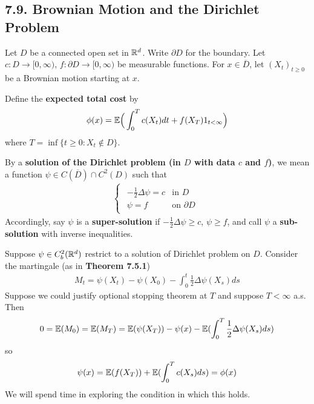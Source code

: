 \documentclass[12pt,a4paper]{report}
\begin{document}
\subsection*{7.9. Brownian Motion and the Dirichlet Problem}

Let $D$ be a connected open set in $\mathbb{R}^d$. Write $\partial D$ for the boundary. Let $c: D \rightarrow [0,\infty)$, $f: \partial D \rightarrow [0,\infty)$ be measurable functions. For $x\in \overline{D}$, let $(X_t)_{t\geq 0}$ be a Brownian motion starting at $x$.

\quad Define the \textbf{expected total cost} by
\begin{align*}
\phi(x) = \mathbb{E} \Big( \int_0^T c(X_t) dt + f(X_T) 1_{t< \infty} \Big)
\end{align*}
where $T = \inf \{ t\geq 0 : X_t \not\in D \}$. 

\quad By a \textbf{solution of the Dirichlet problem (in $D$ with data $c$ and $f$)}, we mean a function $\psi \in C(\overline{D}) \cap C^2 (D)$ such that
\begin{align*}
\begin{cases}
\begin{array}{ll}
-\frac{1}{2} \Delta \psi = c & \text{in } D \\
\psi = f & \text{on } \partial D
\end{array}
\end{cases}
\end{align*}
Accordingly, say $\psi$ is a \textbf{super-solution} if $-\frac{1}{2} \Delta \psi \geq c$, $\psi \geq f$, and call $\psi$ a \textbf{sub-solution} with inverse inequalities.

\quad Suppose $\psi \in C_b^2(\mathbb{R}^d)$ restrict to a solution of Dirichlet problem on $D$. Consider the martingale (as in \textbf{Theorem 7.5.1})
\begin{align*}
M_t = \psi(X_t) - \psi(X_0) - \int_0^t \frac{1}{2} \Delta \psi (X_s) ds
\end{align*}
Suppose we could justify optional stopping theorem at $T$ and suppose $T< \infty $ a.s. Then
\begin{align*}
0 = \mathbb{E}(M_0) = \mathbb{E}(M_T) = \mathbb{E}(\psi(X_T)) - \psi(x) - \mathbb{E}(\int_0^T \frac{1}{2} \Delta \psi(X_s) ds)
\end{align*} 
so 
\begin{align*}
\psi(x) = \mathbb{E}(f(X_T)) + \mathbb{E}(\int_0^T c(X_s) ds) = \phi(x)
\end{align*}
We will spend time in exploring the condition in which this holds.
\s
\end{document}
